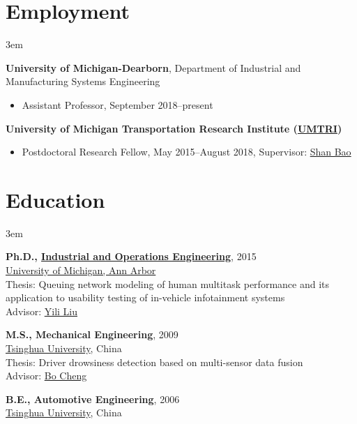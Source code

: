 \documentclass[11pt]{article}
\newenvironment{main}
{\begin{adjustwidth}{3em}{}}
{\end{adjustwidth}}
\begin{document}
\section*{Employment}
\begin{main}

\textbf{University of Michigan-Dearborn}, Department of Industrial and Manufacturing Systems Engineering

\begin{itemize}
    \item[] Assistant Professor, September 2018–present
\end{itemize}

\textbf{University of Michigan Transportation Research Institute (\href{http://www.umtri.umich.edu/}{UMTRI})}

\begin{itemize}
    \item[] Postdoctoral Research Fellow, May 2015–August 2018, Supervisor: \href{https://sites.google.com/umich.edu/hfet-lab/people}{Shan Bao}
\end{itemize}


\end{main}
\section*{Education}
\begin{main}

\textbf{Ph.D., \href{https://ioe.engin.umich.edu/}{Industrial and Operations Engineering}}, 2015\\
\href{https://umich.edu/}{University of Michigan, Ann Arbor}\\
Thesis: Queuing network modeling of human multitask performance and its application to usability testing of in-vehicle infotainment systems\\
Advisor: \href{https://ioe.engin.umich.edu/people/yili-liu/}{Yili Liu}

\textbf{M.S., Mechanical Engineering}, 2009\\
\href{https://www.tsinghua.edu.cn/en/index.htm}{Tsinghua University}, China\\
Thesis: Driver drowsiness detection based on multi-sensor data fusion\\
Advisor: \href{http://www.svm.tsinghua.edu.cn/essay/74/364.html}{Bo Cheng}

\textbf{B.E., Automotive Engineering}, 2006\\
\href{https://www.tsinghua.edu.cn/en/index.htm}{Tsinghua University}, China


\end{main}
\end{document}
